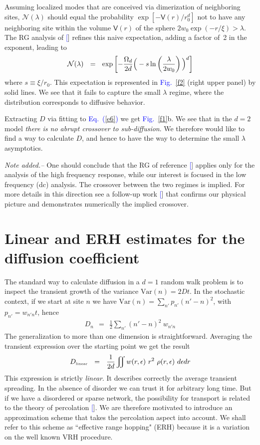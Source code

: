 \documentclass[aps,pre,floats,floatfix,twocolumn]{revtex4}
\newcommand{\tbox}[1]{\mbox{\tiny #1}}
\newcommand{\mylabel}[1]{\label{#1}}
\newcommand{\beq}{\begin{eqnarray}}
\newcommand{\eeq}{\end{eqnarray}}
\newcommand{\be}[1]{\begin{eqnarray}\ifthenelse{#1=-1}
{\nonumber}{\ifthenelse{#1=0}{}{\mylabel{e#1}}}}
\newcommand{\Eq}[1]{\textcolor{blue}{Eq.\!\!~(\ref{#1})}}
\newcommand{\Fig}[1]{\textcolor{blue}{Fig.}\!\!~\ref{#1}}
\newcommand{\rmrk}[1]{#1}
\renewcommand{\cite}[1]{\textcolor{blue}{[\onlinecite{#1}}]} %
\begin{document}
Assuming localized modes that are conceived via dimerization of 
neighboring sites, $\mathcal{N}(\lambda)$ should equal 
the probability $\exp[-\mathsf{V}(r)/r_0^d]$ 
not to have any neighboring site within 
the volume $\mathsf{V}(r)$ of the sphere ${2w_0 \exp(-r/\xi) > \lambda}$. 
The RG analysis of \cite{amir} refines this naive 
expectation, adding a factor of~2 in the exponent, leading to 
%
\be{23}
\mathcal{N}(\lambda) \ \ = \ \ \exp\left[ -\frac{\Omega_d}{2d} \Big(-s \ln\left(\frac{\lambda}{2w_0}\right)\Big)^d \right]
\eeq
%
where $s \equiv \xi/r_0$. 
This expectation is represented in \Fig{f2} (right upper panel) 
by solid lines.  We see that it fails to capture the small $\lambda$ regime, 
where the distribution corresponds to diffusive behavior. 


Extracting $D$ via fitting to \Eq{e6} we get \Fig{f1}b. 
We see that in the $d{=}2$ model {\em there is no abrupt crossover 
to sub-diffusion}. We therefore would like to find a way 
to calculate $D$, and hence to have the way to determine 
the small $\lambda$ asymptotics. 


\rmrk{{\em Note added.-- }
%
One should conclude that the RG of reference \cite{amir} 
applies only for the analysis of the high frequency response, 
while our interest is focused in the low frequency (dc) analysis.
The crossover between the two regimes is implied. 
For more details in this direction see a follow-up work \cite{amirNEW}
that confirms our physical picture and demonstrates numerically 
the implied crossover.
}


\section{Linear and ERH estimates for the diffusion coefficient}

The standard way to calculate diffusion
in a $d{=}1$ random walk problem is to inspect 
the transient growth of the variance $\mbox{Var}(n)=2Dt$.
In the stochastic context, if we start at site $n$
we have ${\mbox{Var}(n)=\sum_{n'} p_{n'} (n'-n)^2}$, 
with $p_{n'}=w_{n'n}t$, hence
%
\beq
D_n \ \ = \ \ \frac{1}{2} \sum_{n'} (n'-n)^2 \ w_{n'n}
\eeq
%
The generalization to more than one dimension
is straightforward. Averaging the transient expression 
over the starting point we get the result  
%
\be{25}
D_{\tbox{linear}}  \ \ = \ \ \frac{1}{2d}\iint w(r,\epsilon) \ r^2  \ \rho(r,\epsilon) \ d\epsilon dr 
\eeq
%
This expression is strictly {\em linear}.
It describes correctly the average transient spreading. 
In the absence of disorder we can trust it for 
arbitrary long time. But if we have a disordered   
or sparse network, the possibility for transport  
is related to the theory of percolation \cite{AHL,Halp,pollak}.
We are therefore motivated to introduce an approximation 
scheme that takes the percolation aspect into account.
We shall refer to this scheme as ``effective range hopping" (ERH) 
because it is a variation on the well known VRH procedure.
\end{document}
